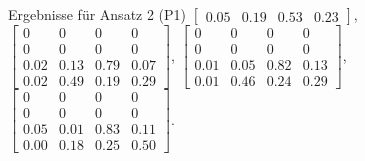 \documentclass[17pt, fleqn]{beamer}
\begin{document}
\begin{frame}{Ergebnisse für Ansatz 2 (P1)}
    \footnotesize{
    $\left[ \begin{array}{rrrr}  0.05 & 0.19 & 0.53 & 0.23  \end{array}\right]$,
    $\left[ \begin{array}{rrrr} 0 & 0 & 0 & 0 \\  0 & 0 & 0 & 0 \\ 0.02 & 0.13 & 0.79 & 0.07 \\ 0.02 & 0.49 & 0.19 & 0.29 \end{array}\right]$,
    $\left[ \begin{array}{rrrr} 0 & 0 & 0 & 0 \\  0 & 0 & 0 & 0 \\ 0.01 & 0.05  & 0.82  & 0.13 \\ 0.01 & 0.46 & 0.24 & 0.29 \end{array}\right]$,
    $\left[ \begin{array}{rrrr} 0 & 0 & 0 & 0 \\  0 & 0 & 0 & 0 \\ 0.05 & 0.01 & 0.83 & 0.11\\ 0.00& 0.18 & 0.25 & 0.50\end{array}\right]$.
    }
\end{frame}
\end{document}
